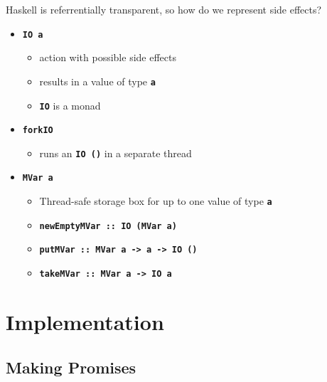 \documentclass{beamer}
\newcommand{\lit}[1]{\textbf{\texttt{#1}}}
\begin{document}
\begin{frame}
  \begin{block}{}
    Haskell is referrentially transparent, so how do we represent side effects?
  \end{block}
  \pause
  \begin{itemize}
  \item \lit{IO a}
    \begin{itemize}
    \item action with possible side effects
    \item results in a value of type \lit a
      \pause\item \lit{IO} is a monad
      \end{itemize}
      \pause
    \item \lit{forkIO}
      \begin{itemize}
      \item runs an \lit{IO ()} in a separate thread
      \end{itemize}
      \pause
    \item \lit{MVar a}
      \begin{itemize}
      \item Thread-safe storage box for up to one value of type \lit a
        \pause
      \item \lit{newEmptyMVar ::\ IO (MVar a)}
        \pause
      \item \lit{putMVar ::\ MVar a -> a -> IO ()}
        \pause
      \item \lit{takeMVar ::\ MVar a -> IO a}
      \end{itemize}
  \end{itemize}
\end{frame}

\section{Implementation}

\begin{frame}
  \centering{\Large \insertsection}
\end{frame}


\subsection{Making Promises}
\end{document}
